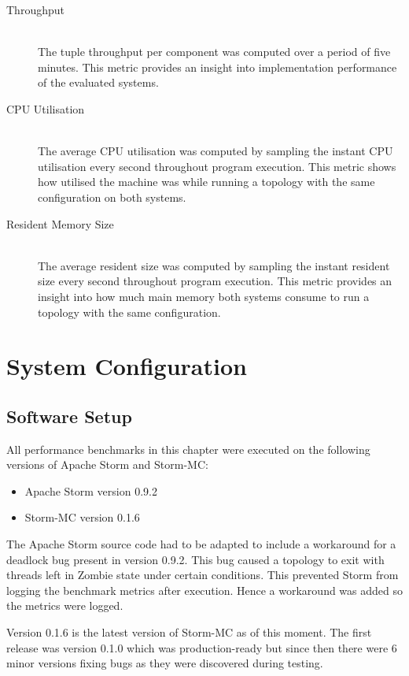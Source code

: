 \documentclass[bsc,twoside,singlespacing,normalheadings,parskip]{infthesis}\usepackage[]{graphicx}\usepackage[]{color}
\begin{document}
\begin{description}
	\item[Throughput] \hfill \\
	The tuple throughput per component was computed over a period of five minutes. This metric provides an insight into implementation performance of the evaluated systems.
	\item[CPU Utilisation] \hfill \\
	The average CPU utilisation was computed by sampling the instant CPU utilisation every second throughout program execution. This metric shows how utilised the machine was while running a topology with the same configuration on both systems.
	\item[Resident Memory Size] \hfill \\
	The average resident size was computed by sampling the instant resident size every second throughout program execution. This metric provides an insight into how much main memory both systems consume to run a topology with the same configuration.
\end{description}

\section{System Configuration}
\label{sec:system_conf}

\subsection{Software Setup}

All performance benchmarks in this chapter were executed on the following versions of Apache Storm and Storm-MC:

\begin{itemize}
	\item Apache Storm version 0.9.2
	\item Storm-MC version 0.1.6
\end{itemize}

The Apache Storm source code had to be adapted to include a workaround for a deadlock bug present in version 0.9.2. This bug caused a topology to exit with threads left in Zombie state under certain conditions. This prevented Storm from logging the benchmark metrics after execution. Hence a workaround was added so the metrics were logged.

Version 0.1.6 is the latest version of Storm-MC as of this moment. The first release was version 0.1.0 which was production-ready but since then there were 6 minor versions fixing bugs as they were discovered during testing.
\end{document}
